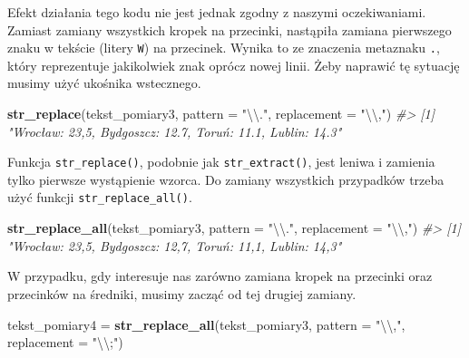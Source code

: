 \documentclass[paper=6in:9in,pagesize=pdftex,headinclude=on,footinclude=on,10pt]{scrbook}
\newenvironment{Shaded}{\begin{snugshade}}{\end{snugshade}}
\newcommand{\CharTok}[1]{\textcolor[rgb]{0.31,0.60,0.02}{#1}}
\newcommand{\CommentTok}[1]{\textcolor[rgb]{0.56,0.35,0.01}{\textit{#1}}}
\newcommand{\DataTypeTok}[1]{\textcolor[rgb]{0.13,0.29,0.53}{#1}}
\newcommand{\KeywordTok}[1]{\textcolor[rgb]{0.13,0.29,0.53}{\textbf{#1}}}
\newcommand{\NormalTok}[1]{#1}
\newcommand{\StringTok}[1]{\textcolor[rgb]{0.31,0.60,0.02}{#1}}
\begin{document}
Efekt działania tego kodu nie jest jednak zgodny z naszymi oczekiwaniami.
Zamiast zamiany wszystkich kropek na przecinki, nastąpiła zamiana pierwszego znaku w tekście (litery \texttt{W}) na przecinek.
Wynika to ze znaczenia metaznaku \texttt{.}, który reprezentuje jakikolwiek znak oprócz nowej linii.
Żeby naprawić tę sytuację musimy użyć ukośnika wstecznego.

\begin{Shaded}
\begin{Highlighting}[]
\KeywordTok{str_replace}\NormalTok{(tekst_pomiary3, }
            \DataTypeTok{pattern =} \StringTok{"}\CharTok{\textbackslash{}\textbackslash{}}\StringTok{."}\NormalTok{, }
            \DataTypeTok{replacement =} \StringTok{"}\CharTok{\textbackslash{}\textbackslash{}}\StringTok{,"}\NormalTok{)}
\CommentTok{#> [1] "Wrocław: 23,5, Bydgoszcz: 12.7, Toruń: 11.1, Lublin: 14.3"}
\end{Highlighting}
\end{Shaded}

Funkcja \texttt{str\_replace()}, podobnie jak \texttt{str\_extract()}, jest leniwa i zamienia tylko pierwsze wystąpienie wzorca.
Do zamiany wszystkich przypadków trzeba użyć funkcji \texttt{str\_replace\_all()}.

\begin{Shaded}
\begin{Highlighting}[]
\KeywordTok{str_replace_all}\NormalTok{(tekst_pomiary3, }
                \DataTypeTok{pattern =} \StringTok{"}\CharTok{\textbackslash{}\textbackslash{}}\StringTok{."}\NormalTok{, }
                \DataTypeTok{replacement =} \StringTok{"}\CharTok{\textbackslash{}\textbackslash{}}\StringTok{,"}\NormalTok{)}
\CommentTok{#> [1] "Wrocław: 23,5, Bydgoszcz: 12,7, Toruń: 11,1, Lublin: 14,3"}
\end{Highlighting}
\end{Shaded}

W przypadku, gdy interesuje nas zarówno zamiana kropek na przecinki oraz przecinków na średniki, musimy zacząć od tej drugiej zamiany.

\begin{Shaded}
\begin{Highlighting}[]
\NormalTok{tekst_pomiary4 =}\StringTok{ }\KeywordTok{str_replace_all}\NormalTok{(tekst_pomiary3,}
                                 \DataTypeTok{pattern =} \StringTok{"}\CharTok{\textbackslash{}\textbackslash{}}\StringTok{,"}\NormalTok{,}
                                 \DataTypeTok{replacement =} \StringTok{"}\CharTok{\textbackslash{}\textbackslash{}}\StringTok{;"}\NormalTok{)}
\end{Highlighting}
\end{Shaded}
\end{document}
